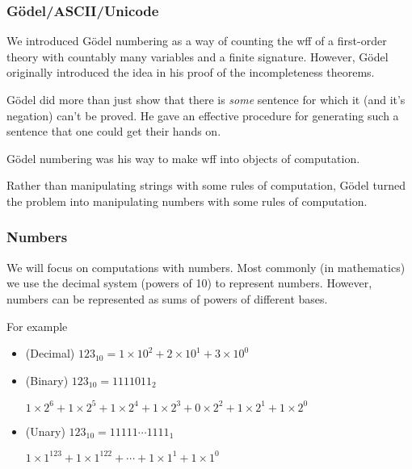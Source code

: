 \documentclass{beamer}
\theoremstyle{indentDefn} \newtheorem{defn}[]{Definition}
\begin{document}
\begin{frame}
	\frametitle{G\"{o}del/ASCII/Unicode}

	We introduced G\"{o}del numbering as a way of counting the wff of a first-order theory with countably many variables and a finite signature. However, G\"{o}del originally introduced the idea in his proof of the incompleteness theorems. 

	\vspace{0.5cm}

	G\"{o}del did more than just show that there is \emph{some} sentence for which it (and it's negation) can't be proved. He gave an effective procedure for generating such a sentence that one could get their hands on. 

	\vspace{0.5cm}

	G\"{o}del numbering was his way to make wff into objects of computation.

	\vspace{0.5cm}

	Rather than manipulating strings with some rules of computation, G\"{o}del turned the problem into manipulating numbers with some rules of computation.
\end{frame}

\begin{frame}
	\frametitle{Numbers}

	We will focus on computations with numbers. Most commonly (in mathematics) we use the decimal system (powers of 10) to represent numbers. However, numbers can be represented as sums of powers of different bases. 

	\vspace{0.5cm}

	For example 

	\vspace{0.1cm}

	\begin{itemize}

		\item (Decimal) $123_{10} = 1\times 10^{2} + 2\times 10^{1} + 3\times 10^{0}$ \vspace{0.5cm}

		\item (Binary) $123_{10} = 1111011_{2}$
		
		$1\times 2^{6} + 1\times 2^{5} + 1\times 2^{4} + 1\times 2^{3} + 0\times 2^{2} + 1\times 2^{1} + 1\times 2^{0}$ \vspace{0.5cm}

		\item (Unary) $123_{10} = 11111 \cdots 1111_{1}$
		
		$1\times 1^{123} + 1\times 1^{122} + \cdots + 1\times 1^{1} + 1\times 1^{0}$
	\end{itemize}

\end{frame}
\end{document}
